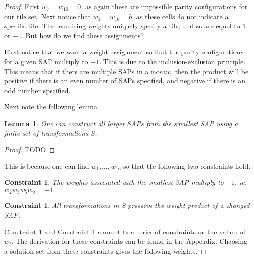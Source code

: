 \documentclass[12pt]{article}
\theoremstyle{plain}
\newtheorem{lemma}[thm]{Lemma}
\newtheorem{constraint}[thm]{Constraint}
\theoremstyle{definition}
\theoremstyle{remark}
\theoremstyle{definition}
\begin{document}
\begin{proof}
First $w_{7}=w_{10}=0$, as again these are impossible parity configurations for our tile set. Next notice that $w_{1} = w_{16} = b$, as these cells do not indicate a specific tile.  The remaining weights uniquely specify a tile, and so are equal to $1$ or $-1$. But how do we find these assignments?

First notice that we want a weight assignment so that the parity configurations for a given SAP multiply to $-1$. This is due to the inclusion-exclusion principle. This means that if there are multiple SAPs in a mosaic, then the product will be positive if there is an even number of SAPs specified, and negative if there is an odd number specified.

Next note the following lemma.
\begin{lemma}
    \label{lemma: build bigger saps}
    One can construct all larger SAPs from the smallest SAP using a finite set of transformations $S$.
\end{lemma}

\begin{proof}
    TODO
\end{proof}

This is because one can find $w_{1} , \dots, w_{16}$ so that the following two constraints hold:

\begin{constraint}
    \label{constraint: smallest sap prod}
    The weights associated with the smallest SAP multiply to $-1$, ie. $w_2 w_3 w_5 w_9 = -1.$ 
\end{constraint}

\begin{constraint}
    \label{constraint: prod works}
    \emph{All} transformations in $S$ preserve the weight product of a changed SAP.
\end{constraint}

Constraint \ref{constraint: smallest sap prod} and Constraint \ref{constraint: prod works} amount to a series of constraints on the values of $w_i$. The derivation for these constraints can be found in the Appendix. Choosing a solution set from these constraints gives the following weights.


\end{proof}
\end{document}
